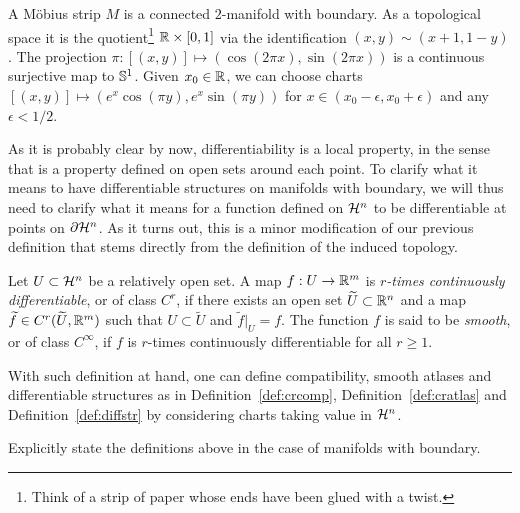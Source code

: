 \begin{example}\label{ex:mobius}
	A M\"obius strip $M$ is a connected $2$-manifold with boundary.
	As a topological space it is the quotient\footnote{Think of a strip of paper whose ends have been glued with a twist.} $\mathbb{R}\times[0,1]$ via the identification $(x,y)\sim(x+1, 1-y)$.
	The projection $\pi: [(x,y)] \mapsto (\cos(2\pi x), \sin(2\pi x))$ is a continuous surjective map to $\mathbb{S}^1$.  Given $x_0\in\mathbb{R}$, we can choose charts $[(x,y)]\mapsto (e^x\cos(\pi y), e^x\sin(\pi y))$ for $x\in(x_0 - \epsilon, x_0 + \epsilon)$ and any $\epsilon < 1/2$.
\end{example}

As it is probably clear by now, differentiability is a local property, in the sense that is a property defined on open sets around each point.
To clarify what it means to have differentiable structures on manifolds with boundary, we will thus need to clarify what it means for a function defined on $\mathcal{H}^n$ to be differentiable at points on $\partial\mathcal{H}^n$.
As it turns out, this is a minor modification of our previous definition that stems directly from the definition of the induced topology.

\begin{definition}
	Let $U\subset\mathcal{H}^n$ be a relatively open set. A map $f: U\to\mathbb{R}^m$ is \emph{$r$-times continuously differentiable}, or of class $C^r$, if there exists an open set $\widetilde U\subset\mathbb{R}^n$ and a map $\widetilde f\in C^r(\widetilde U, \mathbb{R}^m)$ such that $U\subset\widetilde U$ and $\widetilde f|_U = f$.
	The function $f$ is said to be \emph{smooth}, or of class $C^\infty$, if $f$ is $r$-times continuously differentiable for all $r\geq 1$.
\end{definition}

With such definition at hand, one can define compatibility, smooth atlases and differentiable structures as in Definition~\ref{def:crcomp}, Definition~\ref{def:cratlas} and Definition~\ref{def:diffstr} by considering charts taking value in $\mathcal{H}^n$.

\begin{exercise}
	Explicitly state the definitions above in the case of manifolds with boundary.
\end{exercise}

